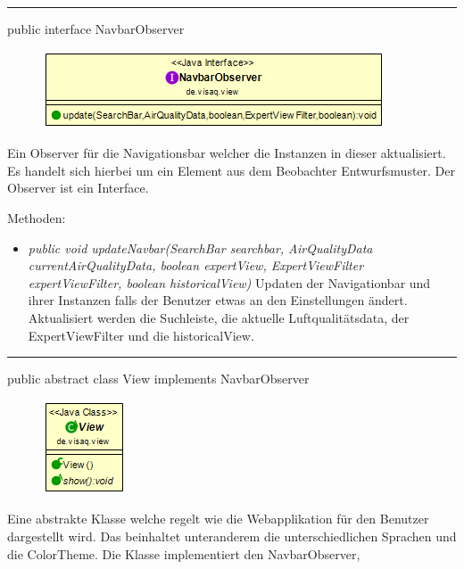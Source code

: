 \rule{\textwidth}{0.4pt} 
public interface NavbarObserver 

\begin{minipage}{0.4\textwidth}
    \begin{figure}[H]
        \includegraphics[scale = 0.5]{media/frontend/view/de.view/NavbarObserver_Class.png}
    \end{figure}
    \end{minipage} \hfill
    \begin{minipage}{0.4\textwidth}
Ein Observer für die Navigationsbar welcher die Instanzen in dieser aktualisiert. Es handelt sich hierbei um ein Element aus dem Beobachter Entwurfsmuster. Der Observer ist ein Interface.
\end{minipage}

Methoden:
\begin{itemize} 
    \item \emph{public void updateNavbar(SearchBar searchbar, AirQualityData currentAirQualityData,
    boolean expertView, ExpertViewFilter expertViewFilter, boolean historicalView)} Updaten der Navigationbar und ihrer Instanzen falls der Benutzer etwas an den Einstellungen ändert. Aktualisiert werden die Suchleiste, die aktuelle Luftqualitätsdata, der ExpertViewFilter und die historicalView.
\end{itemize}

\rule{\textwidth}{0.4pt} 
public abstract class View implements NavbarObserver

\begin{minipage}{0.3\textwidth}
    \begin{figure}[H]
        \includegraphics[scale = 0.7]{media/frontend/view/de.view/View_Class.png}
    \end{figure}
    \end{minipage} \hfill
    \begin{minipage}{0.6\textwidth}
Eine abstrakte Klasse welche regelt wie die Webapplikation für den Benutzer dargestellt wird. Das beinhaltet unteranderem die unterschiedlichen Sprachen und die ColorTheme. Die Klasse implementiert den NavbarObserver,
\end{minipage}

